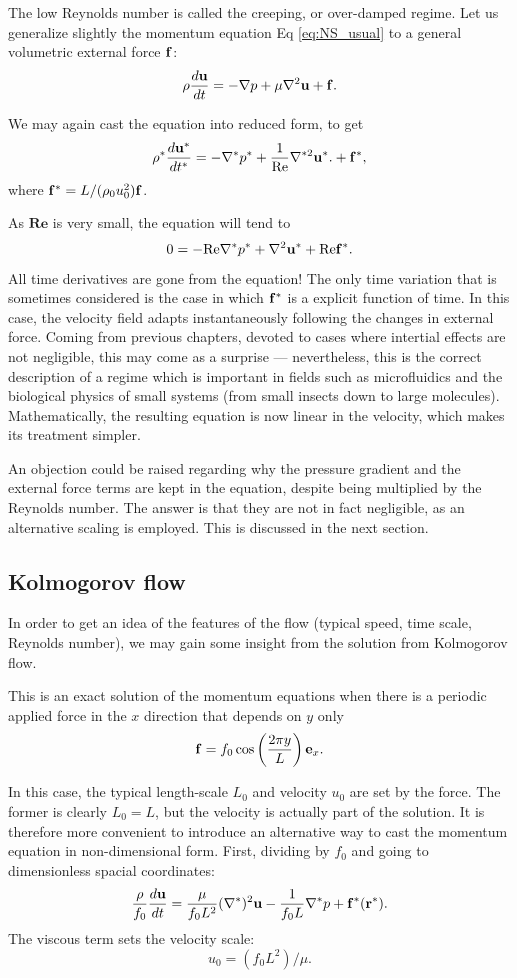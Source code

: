 The low Reynolds number is called the creeping, or over-damped
regime. Let us generalize slightly the momentum equation
Eq \ref{eq:NS_usual} to a general volumetric external force $\mathbf{f}$:
\[
  \rho \frac{d\mathbf{u} }{dt} =
  - \nabla p 
  + \mu \nabla^2 \mathbf{u}
  + \mathbf{f} .
\]

We may again cast the equation into reduced form, to get
\[
\rho^* \frac{d\mathbf{u}^* }{dt^* } =
-  \nabla^* p^*
+  \frac1{\mathrm{Re}} \nabla^{*2} \mathbf{u}^* .
+  \mathbf{f}^* ,
\]
where $\mathbf{f}^*= L/(\rho_0 u_0^2) \mathbf{f}$. 

As $\mathbf{Re}$ is very small, the equation will tend to
\[
0 = - \mathrm{Re} \nabla^* p^* + \nabla^2 \mathbf{u}^* + \mathrm{Re} \mathbf{f}^*
.
\]
All time derivatives are gone from the equation! The only time
variation that is sometimes considered is the case in which $\mathbf{f}^*$
is a explicit function of time. In this case, the velocity field
adapts instantaneously following the changes in external force. Coming
from previous chapters, devoted to cases where intertial effects are
not negligible, this may come as a surprise --- nevertheless, this is
the correct description of a regime which is important in fields such
as microfluidics and the biological physics of small systems (from
small insects down to large molecules).  Mathematically, the resulting
equation is now linear in the velocity, which makes its treatment
simpler.

An objection could be raised regarding why the pressure gradient and
the external force terms are kept in the equation, despite being
multiplied by the Reynolds number. The answer is that they are not
in fact negligible, as an alternative scaling is employed. This is
discussed in the next section.



\subsection{Kolmogorov flow}

In order to get an idea of the features of the flow (typical speed,
time scale, Reynolds number), we may gain some insight from the
solution from Kolmogorov flow.

This is an exact solution of the momentum equations when there is a
periodic applied force in the $x$ direction that depends on $y$ only
\[
\mathbf{f} = f_0 \cos\left( \frac{2\pi y}{L} \right) \mathbf{e}_x .
\]

In this case, the typical length-scale $L_0$ and velocity $u_0$ are
set by the force. The former is clearly $L_0=L$, but the velocity is
actually part of the solution. It is therefore more convenient to
introduce an alternative way to cast the momentum equation in
non-dimensional form. First, dividing by $f_0$ and going to
dimensionless spacial coordinates:
\begin{equation}
\label{eq:Navier-Stokes_nondim1}
\frac{\rho}{f_0}
\frac{d \mathbf{u}}{d t} =
\frac\mu{f_0 L^2} (\nabla^*)^2 \mathbf{u}
-\frac 1{f_0 L} \nabla^* p + \mathbf{f}^*(\mathbf{r}^*) .
\end{equation}
The viscous term sets the velocity scale:
\begin{equation}
  \label{eq:reduced_u0}
  u_0 = ( f_0 L^2 ) / \mu .
\end{equation}

